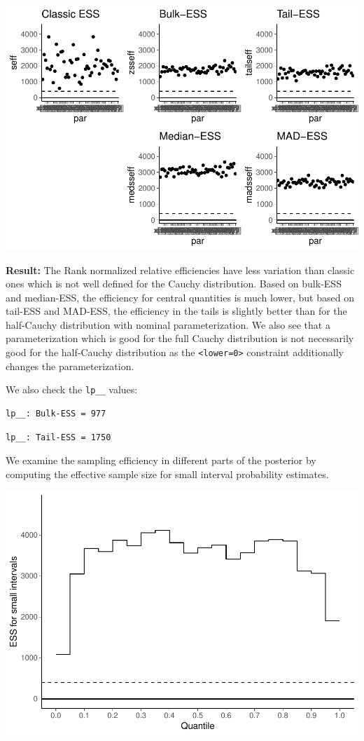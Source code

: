 \documentclass[american,]{article}
\begin{document}
\includegraphics{graphics/ess-fit-half-reparam-1.pdf}

\textbf{Result:} The Rank normalized relative efficiencies have less
variation than classic ones which is not well defined for the Cauchy
distribution. Based on bulk-ESS and median-ESS, the efficiency for
central quantities is much lower, but based on tail-ESS and MAD-ESS, the
efficiency in the tails is slightly better than for the half-Cauchy
distribution with nominal parameterization. We also see that a
parameterization which is good for the full Cauchy distribution is not
necessarily good for the half-Cauchy distribution as the
\texttt{\textless{}lower=0\textgreater{}} constraint additionally
changes the parameterization.

We also check the \texttt{lp\_\_} values:

\begin{verbatim}
lp__: Bulk-ESS = 977
\end{verbatim}

\begin{verbatim}
lp__: Tail-ESS = 1750
\end{verbatim}

We examine the sampling efficiency in different parts of the posterior
by computing the effective sample size for small interval probability
estimates.

\includegraphics{graphics/local-ess-fit-half-reparam-1.pdf}
\end{document}
